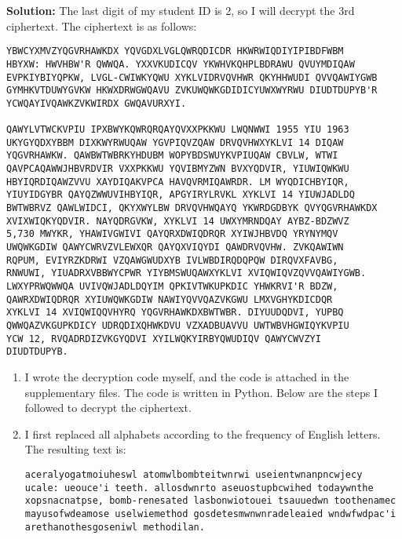\documentclass[11pt,epsfig]{article}
\begin{document}
\begin{description}
\textbf{Solution:}
The last digit of my student ID is 2, so I will decrypt the 3rd ciphertext. The ciphertext is as follows:

\begin{verbatim}
YBWCYXMVZYQGVRHAWKDX YQVGDXLVGLQWRQDICDR HKWRWIQDIYIPIBDFWBM
HBYXW: HWVHBW'R QWWQA. YXXVKUDICQV YKWHVKQHPLBDRAWU QVUYMDIQAW
EVPKIYBIYQPKW, LVGL-CWIWKYQWU XYKLVIDRVQVHWR QKYHHWUDI QVVQAWIYGWB
GYMHKVTDUWYGVKW HKWXDRWGWQAVU ZVKUWQWKGDIDICYUWXWYRWU DIUDTDUPYB'R
YCWQAYIVQAWKZVKWIRDX GWQAVURXYI.

QAWYLVTWCKVPIU IPXBWYKQWRQRQAYQVXXPKKWU LWQNWWI 1955 YIU 1963
UKYGYQDXYBBM DIXKWYRWUQAW YGVPIQVZQAW DRVQVHWXYKLVI 14 DIQAW
YQGVRHAWKW. QAWBWTWBRKYHDUBM WOPYBDSWUYKVPIUQAW CBVLW, WTWI
QAVPCAQAWWJHBVRDVIR VXXPKKWU YQVIBMYZWN BVXYQDVIR, YIUWIQWKWU
HBYIQRDIQAWZVVU XAYDIQAKVPCA HAVQVRMIQAWRDR. LM WYQDICHBYIQR,
YIUYIDGYBR QAYQZWWUVIHBYIQR, APGYIRYLRVKL XYKLVI 14 YIUWJADLDQ
BWTWBRVZ QAWLWIDCI, QKYXWYLBW DRVQVHWQAYQ YKWRDGDBYK QVYQGVRHAWKDX
XVIXWIQKYQDVIR. NAYQDRGVKW, XYKLVI 14 UWXYMRNDQAY AYBZ-BDZWVZ
5,730 MWYKR, YHAWIVGWIVI QAYQRXDWIQDRQR XYIWJHBVDQ YRYNYMQV
UWQWKGDIW QAWYCWRVZVLEWXQR QAYQXVIQYDI QAWDRVQVHW. ZVKQAWIWN
RQPUM, EVIYRZKDRWI VZQAWGWUDXYB IVLWBDIRQDQPQW DIRQVXFAVBG,
RNWUWI, YIUADRXVBBWYCPWR YIYBMSWUQAWXYKLVI XVIQWIQVZQVVQAWIYGWB.
LWXYPRWQWWQA UVIVQWJADLDQYIM QPKIVTWKUPKDIC YHWKRVI'R BDZW,
QAWRXDWIQDRQR XYIUWQWKGDIW NAWIYQVVQAZVKGWU LMXVGHYKDICDQR
XYKLVI 14 XVIQWIQQVHYRQ YQGVRHAWKDXBWTWBR. DIYUUDQDVI, YUPBQ
QWWQAZVKGUPKDICY UDRQDIXQHWKDVU VZXADBUAVVU UWTWBVHGWIQYKVPIU
YCW 12, RVQADRDIZVKGYQDVI XYILWQKYIRBYQWUDIQV QAWYCWVZYI
DIUDTDUPYB.
\end{verbatim}

\begin{enumerate}
    \item I wrote the decryption code myself, and the code is attached in the supplementary files. The code is written in Python. Below are the steps I followed to decrypt the ciphertext.
    \item I first replaced all alphabets according to the frequency of English letters. The resulting text is:

\begin{verbatim}
aceralyogatmoiuheswl atomwlbombteitwnrwi useientwnanpncwjecy
ucale: ueouce'i teeth. allosdwnrto aseuostupbcwihed todaywnthe
xopsnacnatpse, bomb-renesated lasbonwiotouei tsauuedwn toothenamec
mayusofwdeamose uselwiemethod gosdetesmwnwnradeleaied wndwfwdpac'i
arethanothesgoseniwl methodilan.


\end{verbatim}
\end{enumerate}
\end{description}
\end{document}
